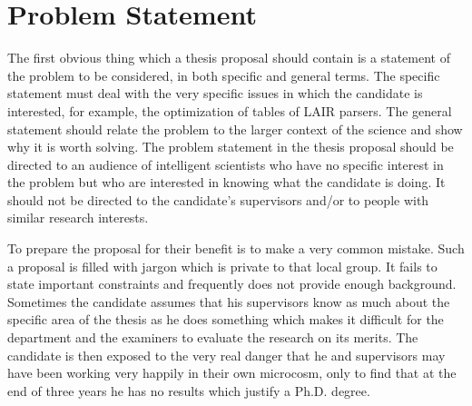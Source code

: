 \section{Problem Statement}\label{sec:problem}

The first obvious thing which a thesis proposal should contain is a statement of the problem to be considered, in both specific and general terms. The specific statement must deal with the very specific issues in which the candidate is interested, for example, the optimization of tables of LAIR parsers. The general statement should relate the problem to the larger context of the science and show why it is worth solving. The problem statement in the thesis proposal should be directed to an audience of intelligent scientists who have no specific interest in the problem but who are interested in knowing what the candidate is doing. It should not be directed to the candidate's supervisors and/or to people with similar research interests.

To prepare the proposal for their benefit is to make a very common mistake. Such a proposal is filled with jargon which is private to that local group. It fails to state important constraints and frequently does not provide enough background. Sometimes the candidate assumes that his supervisors know as much about the specific area of the thesis as he does something which makes it difficult for the department and the examiners to evaluate the research on its merits. The candidate is then exposed to the very real danger that he and supervisors may have been working very happily in their own microcosm, only to find that at the end of three years he has no results which justify a Ph.D. degree.














